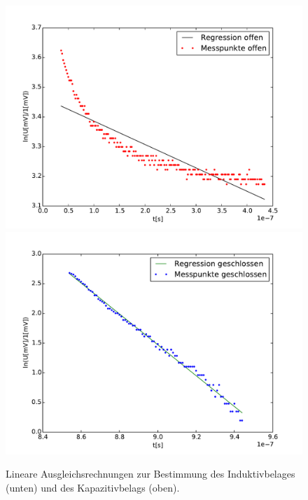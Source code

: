 \begin{figure}
	\centering
	\includegraphics[width = 14cm]{data/c/Regression1.pdf}
	\includegraphics[width = 14cm]{data/c/Regression2.pdf}
	\caption{Lineare Ausgleichsrechnungen zur Bestimmung des Induktivbelages (unten) und des Kapazitivbelags (oben).}
	\label{fig_fit1}
\end{figure}
